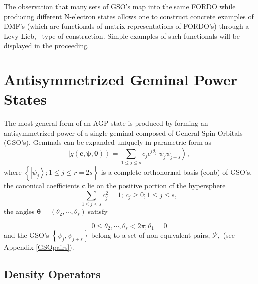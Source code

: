 \documentclass[aps,preprint]{revtex4}%
\begin{document}
The observation that many sets of GSO's map into the same FORDO while
producing different N-electron states allows one to construct concrete
examples of DMF's (which are functionals of matrix representations of FORDO's)
through a Levy-Lieb\cite{Levy1979}, \cite{Lieb1983} \ type of construction.
Simple examples of such functionals will be displayed in the proceeding.

\section{Antisymmetrized Geminal Power States\label{AGP States}}

The most general form of an AGP state is produced by forming an
antisymmetrized power of a single geminal composed of General Spin Orbitals
(GSO's). Geminals can be expanded uniquely in parametric form as
\begin{equation}
\left\vert g\left(  \mathbf{c},\bm{\psi,\theta}\right)  \right\rangle
=\sum_{1\leq j\leq s}c_{j}e^{i\theta_{j}}\left\vert \psi_{j}\psi
_{j+s}\right\rangle , \label{gem}%
\end{equation}
where $\left\{  \left\vert \psi_{j}\right\rangle ;1\leq j\leq r=2s\right\}  $
is a complete orthonormal basis (conb) of GSO's, the canonical coefficients
$\bm{c}$ lie on the positive portion of the hypersphere
\begin{equation}
\sum\limits_{1\leq j\leq s}c_{j}^{2}=1;\,c_{j}\geq0;1\leq j\leq s,
\end{equation}
the angles $\bm{\theta}=\left(  \theta_{2},\cdots,\theta_{s}\right)  $ satisfy%

\begin{equation}
0\leq\theta_{2},\cdots,\theta_{s}<2\pi;\theta_{1}=0 \label{Phases}%
\end{equation}
and the GSO's $\left\{  \psi_{j},\psi_{j+s}\right\}  $ belong to a set of non
equivalent pairs, $\mathcal{P},$ (see Appendix \ref{GSOpairs}).

\subsection{Density Operators\label{DenOp}}
\end{document}
